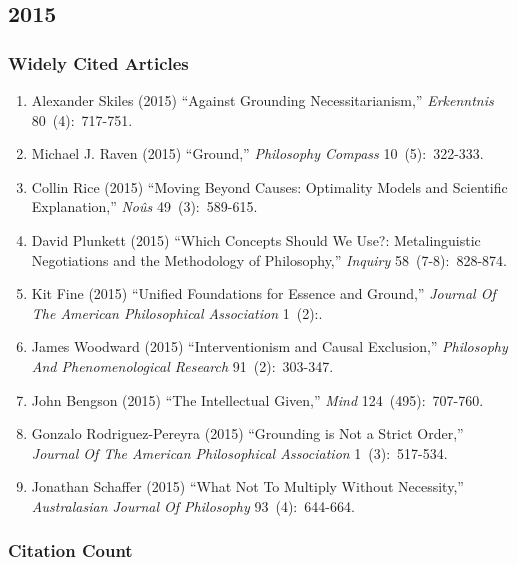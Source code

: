 \documentclass[
  10pt,
  letterpaper,
  DIV=11,
  numbers=noendperiod,
  twoside]{scrartcl}
\providecommand{\tightlist}{%
  \setlength{\itemsep}{0pt}\setlength{\parskip}{0pt}}\usepackage{longtable,booktabs,array}
\begin{document}
\newpage

\subsection{2015}\label{sec-s2015}

\subsubsection*{Widely Cited Articles}\label{widely-cited-articles-58}

\begin{enumerate}
\def\labelenumi{\arabic{enumi}.}
\tightlist
\item
  Alexander Skiles (2015) ``Against Grounding Necessitarianism,''
  \emph{Erkenntnis} 80~(4):~717-751.
\item
  Michael J. Raven (2015) ``Ground,'' \emph{Philosophy Compass}
  10~(5):~322-333.
\item
  Collin Rice (2015) ``Moving Beyond Causes: Optimality Models and
  Scientific Explanation,'' \emph{Noûs} 49~(3):~589-615.
\item
  David Plunkett (2015) ``Which Concepts Should We Use?: Metalinguistic
  Negotiations and the Methodology of Philosophy,'' \emph{Inquiry}
  58~(7-8):~828-874.
\item
  Kit Fine (2015) ``Unified Foundations for Essence and Ground,''
  \emph{Journal Of The American Philosophical Association} 1~(2):.
\item
  James Woodward (2015) ``Interventionism and Causal Exclusion,''
  \emph{Philosophy And Phenomenological Research} 91~(2):~303-347.
\item
  John Bengson (2015) ``The Intellectual Given,'' \emph{Mind}
  124~(495):~707-760.
\item
  Gonzalo Rodriguez-Pereyra (2015) ``Grounding is Not a Strict Order,''
  \emph{Journal Of The American Philosophical Association}
  1~(3):~517-534.
\item
  Jonathan Schaffer (2015) ``What Not To Multiply Without Necessity,''
  \emph{Australasian Journal Of Philosophy} 93~(4):~644-664.
\end{enumerate}

\subsubsection*{Citation Count}\label{sec-count-2015}
\end{document}
